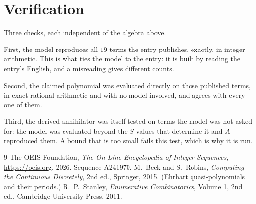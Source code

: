 \documentclass[11pt,a4paper]{article}
\theoremstyle{plain}
\theoremstyle{definition}
\begin{document}
\section{Verification}

Three checks, each independent of the algebra above.

First, the model reproduces all $19$ terms the entry publishes, exactly, in integer
arithmetic. This is what ties the model to the entry: it is built by reading the entry's
English, and a misreading gives different counts.

Second, the claimed polynomial was evaluated directly on those published terms, in exact
rational arithmetic and with no model involved, and agrees with every one of them.

Third, the derived annihilator was itself tested on terms the model was not asked for: the
model was evaluated beyond the $S$ values that determine it and $A$ reproduced them. A bound
that is too small fails this test, which is why it is run.

\begin{thebibliography}{9}
 The OEIS Foundation, \emph{The On-Line Encyclopedia of Integer
Sequences}, \url{https://oeis.org}, 2026. Sequence A241970.
 M.~Beck and S.~Robins, \emph{Computing the Continuous Discretely},
2nd ed., Springer, 2015. (Ehrhart quasi-polynomials and their periods.)
 R.~P.~Stanley, \emph{Enumerative Combinatorics}, Volume 1, 2nd ed.,
Cambridge University Press, 2011.
\end{thebibliography}
\end{document}
